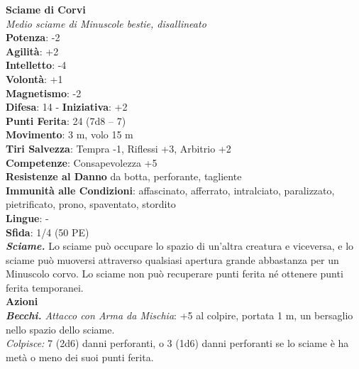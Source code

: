 \begin{multicols}{2}
\medskip\textbf{Sciame di Corvi}\\
\emph{Medio sciame di Minuscole bestie, disallineato}\\
\textbf{Potenza}: -2\\
\textbf{Agilità}: +2\\
\textbf{Intelletto}: -4\\
\textbf{Volontà}: +1\\
\textbf{Magnetismo}: -2\\
\textbf{Difesa}: 14 - \textbf{Iniziativa}: +2\\
\textbf{Punti Ferita}: 24 (7d8 -- 7)\\
\textbf{Movimento}: 3 m, volo 15 m\\
\textbf{Tiri Salvezza}: Tempra -1, Riflessi +3, Arbitrio +2\\
\textbf{Competenze}: Consapevolezza +5\\
\textbf{Resistenze al Danno} da botta, perforante, tagliente \\
\textbf{Immunità alle Condizioni}: affascinato, afferrato, intralciato, paralizzato, pietrificato, prono, spaventato, stordito\\
\textbf{Lingue}: -\\
\textbf{Sfida}: 1/4 (50 PE)\smallskip\\
\emph{\textbf{Sciame.}} Lo sciame può occupare lo spazio di un'altra creatura e viceversa, e lo sciame può muoversi attraverso qualsiasi apertura grande abbastanza per un Minuscolo corvo. Lo sciame non può recuperare punti ferita né ottenere punti ferita temporanei.\\
\smallskip\textbf{Azioni}\\
\emph{\textbf{Becchi.} Attacco con Arma da Mischia}: +5 al colpire, portata 1 m, un bersaglio nello spazio dello sciame.\\
\emph{Colpisce:} 7 (2d6) danni perforanti, o 3 (1d6) danni perforanti se lo sciame è ha metà o meno dei suoi punti ferita.\\


\end{multicols}
